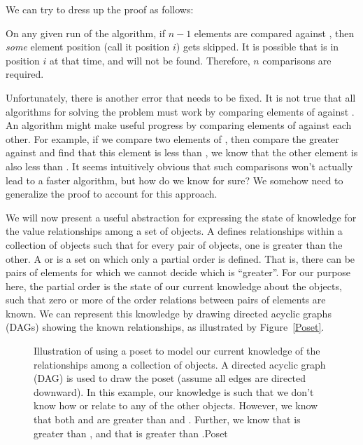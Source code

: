 We can try to dress up the proof as follows:
\begin{numproof}{2}
On any given run of the algorithm,
if \(n-1\) elements are compared against , then
\emph{some} element position (call it position \(i\)) gets skipped.
It is possible that  is in position \(i\) at that time, and
will not be found.
Therefore, \(n\) comparisons are required.
\end{numproof}

Unfortunately, there is another error that needs to be fixed.
It is not true that all algorithms for solving the problem must work
by comparing elements of  against .
An algorithm might make useful progress by comparing elements of
 against each other.
For example, if we compare two elements of , then compare the
greater against  and find that this element is less than
, we know that the other element is also less than .
It seems intuitively obvious that such comparisons won't actually lead
to a faster algorithm, but how do we know for sure?
We somehow need to generalize the proof to account for this approach.

We will now present a useful abstraction for expressing the state of
knowledge for the value relationships among a set of objects.
A  defines relationships within a
collection of objects such that for every pair of objects, one is
greater than the other.
A  or  is a set on which
only a partial order is defined.
That is, there can be pairs of elements for which we cannot decide
which is ``greater''.
For our purpose here, the partial order is the state of our current
knowledge about the objects,
such that zero or more of the order relations between pairs of
elements are known.
We can represent this knowledge by drawing directed acyclic graphs
(DAGs) showing the known relationships, as illustrated by
Figure~\ref{Poset}.

\begin{figure}
\medskip

{Illustration of using a poset to model our current knowledge of the
relationships among a collection of objects.
A directed acyclic graph (DAG) is used to draw the poset
(assume all edges are directed downward).
In this example, our knowledge is such that we don't know how 
or  relate to any of the other objects.
However, we know that both  and  are greater than
 and .
Further, we know that  is greater than , and that
 is greater than .}{Poset}
\bigskip
\end{figure}

